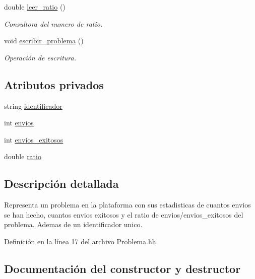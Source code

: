 \begin{DoxyCompactItemize}
double \mbox{\hyperlink{class_problema_a06627ca42b5bf8598d10b04e6a9e255b}{leer\+\_\+ratio}} ()
\begin{DoxyCompactList}\small\item\em Consultora del numero de ratio. \end{DoxyCompactList}\item 
void \mbox{\hyperlink{class_problema_afbf19bc99df3c05b7baa3a138fb9e17d}{escribir\+\_\+problema}} ()
\begin{DoxyCompactList}\small\item\em Operación de escritura. \end{DoxyCompactList}\end{DoxyCompactItemize}
\subsection*{Atributos privados}
\begin{DoxyCompactItemize}
\item 
string \mbox{\hyperlink{class_problema_ac59427a22875e6b6a35490628a220ba6}{identificador}}
\item 
int \mbox{\hyperlink{class_problema_aaef8dcb723fa829a052517a00aed003e}{envios}}
\item 
int \mbox{\hyperlink{class_problema_ad8f0dfd65c2673395ad72ae9817cb7ae}{envios\+\_\+exitosos}}
\item 
double \mbox{\hyperlink{class_problema_acc3d2ce24418ad68650108de4b603d99}{ratio}}
\end{DoxyCompactItemize}


\subsection{Descripción detallada}
Representa un problema en la plataforma con sus estadisticas de cuantos envios se han hecho, cuantos envios exitosos y el ratio de envios/envios\+\_\+exitosos del problema. Ademas de un identificador unico. 

Definición en la línea 17 del archivo Problema.\+hh.



\subsection{Documentación del constructor y destructor}
\mbox{\label{class_problema_a9d81af5f3f42a1b4354ad8f3c022fca3}} 
